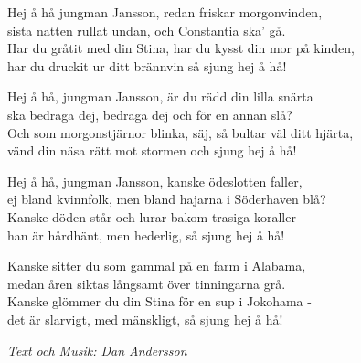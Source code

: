 \vspace{10pt}
Hej å hå jungman Jansson, redan friskar morgonvinden,\\
sista natten rullat undan, och Constantia ska' gå.\\
Har du gråtit med din Stina, har du kysst din mor på kinden,\\
har du druckit ur ditt brännvin så sjung hej å hå!\par
\vspace{10pt}
Hej å hå, jungman Jansson, är du rädd din lilla snärta\\
ska bedraga dej, bedraga dej och för en annan slå?\\
Och som morgonstjärnor blinka, säj, så bultar väl ditt hjärta,\\
vänd din näsa rätt mot stormen och sjung hej å hå!\par
\vspace{10pt}
Hej å hå, jungman Jansson, kanske ödeslotten faller,\\
ej bland kvinnfolk, men bland hajarna i Söderhaven blå?\\
Kanske döden står och lurar bakom trasiga koraller -\\
han är hårdhänt, men hederlig, så sjung hej å hå!\par
\vspace{10pt}
Kanske sitter du som gammal på en farm i Alabama,\\
medan åren siktas långsamt över tinningarna grå.\\
Kanske glömmer du din Stina för en sup i Jokohama -\\
det är slarvigt, med mänskligt, så sjung hej å hå!
\par
\vspace{10pt}
{\footnotesize\textit{Text och Musik: Dan Andersson}}
